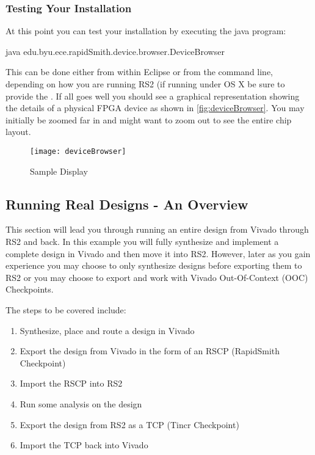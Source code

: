 \subsubsection{Testing Your Installation}
\noindent At this point you can test your installation by executing the java
 program: 
\begin{code}
java edu.byu.ece.rapidSmith.device.browser.DeviceBrowser
\end{code} \vspace{0.1in}    

\noindent This can be done either from within Eclipse or from the command line,
depending on how you are running RS2 (if running under OS X be sure to provide the
. If all goes well you should see a
graphical representation showing the details of a physical FPGA device as shown
in \autoref{fig:deviceBrowser}.  You may initially be zoomed far in and might
want to zoom out to see the entire chip layout.

\begin{figure}[H]
\centering
\texttt{[image: deviceBrowser]}
\caption{ Sample Display}
\label{fig:deviceBrowser}
\end{figure}

\subsection{Running Real Designs - An Overview}
This section will lead you through running an entire design from Vivado through
RS2 and back.  In this example you will fully synthesize and implement a
complete design in Vivado and then move it into RS2.  However, later as you gain
experience you may choose to only synthesize  designs before exporting
them to RS2 or you may choose to export and work with Vivado Out-Of-Context
(OOC) Checkpoints.

The steps to be covered include:

\begin{enumerate}
  \item Synthesize, place and route a design in Vivado
  \item  Export the design from Vivado in the form of an RSCP (RapidSmith
  Checkpoint)
  \item Import the RSCP  into RS2
  \item Run some analysis on the design
  \item Export the design from RS2 as a TCP (Tincr Checkpoint)
  \item Import the TCP back into Vivado
\end{enumerate}

